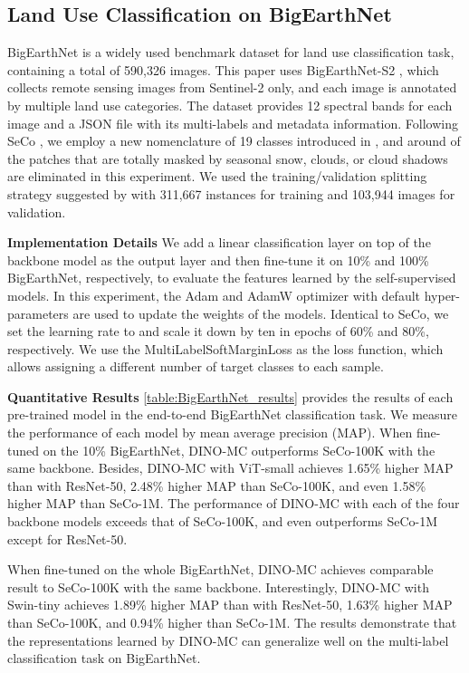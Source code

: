 \documentclass[10pt,twocolumn,letterpaper]{article}
\begin{document}
\subsection{Land Use Classification on BigEarthNet}
BigEarthNet \cite{sumbul2019bigearthnet} is a widely used benchmark dataset for land use classification task, containing a total of 590,326 images.
This paper uses BigEarthNet-S2 \cite{sumbul2019bigearthnet}, which collects remote sensing images from Sentinel-2 only, and each image is annotated by multiple land use categories.
The dataset provides 12 spectral bands for each image and a JSON file with its multi-labels and metadata information.
Following SeCo \cite{manas2021seasonal}, we employ a new nomenclature of 19 classes introduced in \cite{sumbul2020bigearthnet}, and around  of the patches that are totally masked by seasonal snow, clouds, or cloud shadows are eliminated in this experiment.
We used the training/validation splitting strategy suggested by \cite{neumann2019domain} with 311,667 instances for training and 103,944 images for validation.

\textbf{Implementation Details }
We add a linear classification layer on top of the backbone model as the output layer and then fine-tune it on 10\% and 100\% BigEarthNet, respectively, to evaluate the features learned by the self-supervised models.
In this experiment, the Adam and AdamW optimizer with default hyper-parameters are used to update the weights of the models. 
Identical to SeCo, we set the learning rate to  and scale it down by ten in epochs of 60\% and 80\%, respectively.
We use the MultiLabelSoftMarginLoss as the loss function, which allows assigning a different number of target classes to each sample.

\textbf{Quantitative Results}
\cref{table:BigEarthNet_results} provides the results of each pre-trained model in the end-to-end BigEarthNet classification task.
We measure the performance of each model by mean average precision (MAP).
When fine-tuned on the 10\% BigEarthNet, DINO-MC outperforms SeCo-100K with the same backbone.
Besides, DINO-MC with ViT-small achieves 1.65\% higher MAP than with ResNet-50, 2.48\% higher MAP than SeCo-100K, and even 1.58\% higher MAP than SeCo-1M.
The performance of DINO-MC with each of the four backbone models exceeds that of SeCo-100K, and even outperforms SeCo-1M except for ResNet-50.

When fine-tuned on the whole BigEarthNet, DINO-MC achieves comparable result to SeCo-100K with the same backbone.
Interestingly, DINO-MC with Swin-tiny achieves 1.89\% higher MAP than with ResNet-50, 1.63\% higher MAP than SeCo-100K, and 0.94\% higher than SeCo-1M.
The results demonstrate that the representations learned by DINO-MC can generalize well on the multi-label classification task on BigEarthNet.
\end{document}
